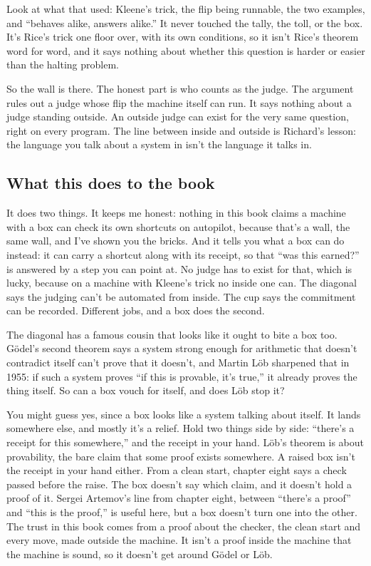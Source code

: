 \documentclass[11pt,twoside]{article}
\theoremstyle{thielethm}
\theoremstyle{thieledef}
\theoremstyle{thieledef}
\theoremstyle{thieledef}
\theoremstyle{thielethm}
\theoremstyle{thieleobs}
\theoremstyle{thielethm}
\begin{document}
Look at what that used: Kleene's trick, the flip being runnable, the two examples, and ``behaves alike, answers alike.'' It never touched the tally, the toll, or the box. It's Rice's trick one floor over, with its own conditions, so it isn't Rice's theorem word for word, and it says nothing about whether this question is harder or easier than the halting problem.

So the wall is there. The honest part is who counts as the judge. The argument rules out a judge whose flip the machine itself can run. It says nothing about a judge standing outside. An outside judge can exist for the very same question, right on every program. The line between inside and outside is Richard's lesson: the language you talk about a system in isn't the language it talks in.

\subsection{What this does to the book}

It does two things. It keeps me honest: nothing in this book claims a machine with a box can check its own shortcuts on autopilot, because that's a wall, the same wall, and I've shown you the bricks. And it tells you what a box can do instead: it can carry a shortcut along with its receipt, so that ``was this earned?'' is answered by a step you can point at. No judge has to exist for that, which is lucky, because on a machine with Kleene's trick no inside one can. The diagonal says the judging can't be automated from inside. The cup says the commitment can be recorded. Different jobs, and a box does the second.

The diagonal has a famous cousin that looks like it ought to bite a box too. Gödel's second theorem says a system strong enough for arithmetic that doesn't contradict itself can't prove that it doesn't, and Martin Löb sharpened that in 1955: if such a system proves ``if this is provable, it's true,'' it already proves the thing itself. So can a box vouch for itself, and does Löb stop it?

You might guess yes, since a box looks like a system talking about itself. It lands somewhere else, and mostly it's a relief. Hold two things side by side: ``there's a receipt for this somewhere,'' and the receipt in your hand. Löb's theorem is about provability, the bare claim that some proof exists somewhere. A raised box isn't the receipt in your hand either. From a clean start, chapter eight says a check passed before the raise. The box doesn't say which claim, and it doesn't hold a proof of it. Sergei Artemov's line from chapter eight, between ``there's a proof'' and ``this is the proof,'' is useful here, but a box doesn't turn one into the other. The trust in this book comes from a proof about the checker, the clean start and every move, made outside the machine. It isn't a proof inside the machine that the machine is sound, so it doesn't get around Gödel or Löb.
\end{document}
